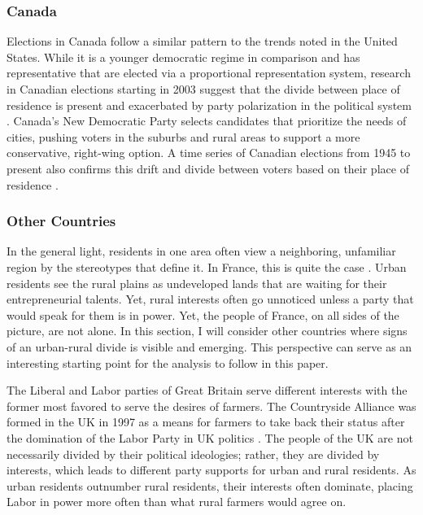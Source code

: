 \documentclass[12pt, titlepage]{article}
\begin{document}
\subsubsection{Canada}

Elections in Canada follow a similar pattern to the trends noted in the United States. While it is a younger democratic regime in comparison and has representative that are elected via a proportional representation system, research in Canadian elections starting in 2003 suggest that the divide between place of residence is present and exacerbated by party polarization in the political system \citep{walks_place_2004}. Canada's New Democratic Party selects candidates that prioritize the needs of cities, pushing voters in the suburbs and rural areas to support a more conservative, right-wing option. A time series of Canadian elections from 1945 to present also confirms this drift and divide between voters based on their place of residence \citep{walks_city-suburban_2005}.

\subsubsection{Other Countries}

In the general light, residents in one area often view a neighboring, unfamiliar region by the stereotypes that define it. In France, this is quite the case \citep{clout_new_2003}. Urban residents see the rural plains as undeveloped lands that are waiting for their entrepreneurial talents. Yet, rural interests often go unnoticed unless a party that would speak for them is in power. Yet, the people of France, on all sides of the picture, are not alone. In this section, I will consider other countries where signs of an urban-rural divide is visible and emerging. This perspective can serve as an interesting starting point for the analysis to follow in this paper.

The Liberal and Labor parties of Great Britain serve different interests with the former most favored to serve the desires of farmers. The Countryside Alliance was formed in the UK in 1997 as a means for farmers to take back their status after the domination of the Labor Party in UK politics \citep{benton_ruralurban_2007}. The people of the UK are not necessarily divided by their political ideologies; rather, they are divided by interests, which leads to different party supports for urban and rural residents. As urban residents outnumber rural residents, their interests often dominate, placing Labor in power more often than what rural farmers would agree on.
\end{document}
